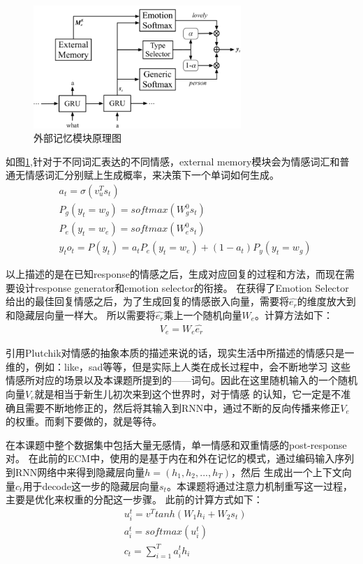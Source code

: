 \documentclass[supercite]{HustGraduPaper}
\theoremstyle{definition}
\begin{document}
\begin{figure}[H] %
  \centering %
  \includegraphics[width=0.7\textwidth]{images/ememory.png} %
  \caption{外部记忆模块原理图} %
  \label{Fig.ememory} %
\end{figure}

如图\ref{Fig.ememory},针对于不同词汇表达的不同情感，external memory模块会为情感词汇和普通无情感词汇分别赋上生成概率，来决策下一个单词如何生成。
\begin{align}
  &a_t = \sigma(v_u^T s_t)\\
  &P_g(y_t = w_g) = softmax(W_g^0 s_t)\\
  &P_e(y_t = w_e) = softmax(W_e^0 s_t)\\
  &y_t o_t = P(y_t) = a_t P_e(y_t=w_e) + (1-a_t)P_y(y_t=w_g)
\end{align}

以上描述的是在已知response的情感之后，生成对应回复的过程和方法，而现在需要设计response generator和emotion selector的衔接。
在获得了Emotion Selector给出的最佳回复情感之后，为了生成回复的情感嵌入向量，需要将$\hat{e_r}$的维度放大到和隐藏层向量一样大。
所以需要将$\hat{e_r}$乘上一个随机向量$W_e$。计算方法如下：
\begin{align}
  V_e = W_e \hat{e_r} \label{3.16} 
\end{align}

引用Plutchik\cite{plutchik1980general}对情感的抽象本质的描述来说的话，现实生活中所描述的情感只是一维的，例如：like，sad等等，但是实际上人类在成长过程中，会不断地学习
这些情感所对应的场景以及本课题所提到的——词句。因此在这里随机输入的一个随机向量$V_e$就是相当于新生儿初次来到这个世界时，对于情感
的认知，它一定是不准确且需要不断地修正的，然后将其输入到RNN中，通过不断的反向传播来修正$V_e$的权重。而剩下要做的，就是等待。

在本课题中整个数据集中包括大量无感情，单一情感和双重情感的post-response对。
在此前的ECM中，使用的是基于内在和外在记忆的模式，通过编码输入序列到RNN网络中来得到隐藏层向量$h = (h_1,h_2,...,h_T)$，然后
生成出一个上下文向量$c_t$用于decode这一步的隐藏层向量$s_t$。本课题将通过注意力机制重写这一过程，主要是优化来权重的分配这一步骤。
此前的计算方式如下：
\begin{align}
  &u_i^t = v^T tanh(W_1h_i + W_2 s_t) \label{3.17}\\
  &a_i^t = softmax(u_i^t) \label{3.18}\\
  &c_t = \sum_{i=1}^T a_i^t h_i \label{3.19}
\end{align}
\end{document}
